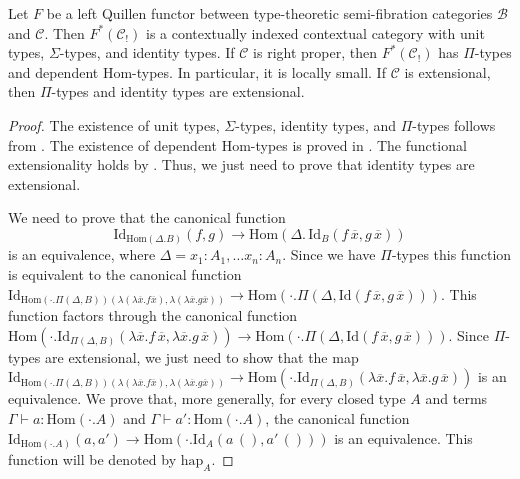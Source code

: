 \documentclass[reqno]{amsart}
\theoremstyle{definition}
\theoremstyle{remark}
\newcommand{\fs}[1]{\mathrm{#1}}
\newcommand{\scat}[1]{\mathcal{#1}}
\newcommand{\Hom}{\fs{Hom}}
\newcommand{\Id}{\fs{Id}}
\numberwithin{figure}{section}
\begin{document}
\begin{prop}
Let $F$ be a left Quillen functor between type-theoretic semi-fibration categories $\scat{B}$ and $\scat{C}$.
Then $F^*(\scat{C}_!)$ is a contextually indexed contextual category with unit types, $\Sigma$-types, and identity types.
If $\scat{C}$ is right proper, then $F^*(\scat{C}_!)$ has $\Pi$-types and dependent $\Hom$-types.
In particular, it is locally small.
If $\scat{C}$ is extensional, then $\Pi$-types and identity types are extensional.
\end{prop}
\begin{proof}
The existence of unit types, $\Sigma$-types, identity types, and $\Pi$-types follows from \cite{local-universes}.
The existence of dependent $\Hom$-types is proved in .
The functional extensionality holds by \cite[Lemma~5.9]{shul-inv}.
Thus, we just need to prove that identity types are extensional.

We need to prove that the canonical function
\[ \Id_{\Hom(\Delta.B)}(f,g) \to \Hom(\Delta.\,\Id_B(f\,\overline{x},g\,\overline{x})) \] is an equivalence, where $\Delta = x_1 : A_1, \ldots x_n : A_n$.
Since we have $\Pi$-types this function is equivalent to the canonical function $\Id_{\Hom(\cdot . \Pi(\Delta,B))(\lambda(\lambda \overline{x}.f\overline{x}),\lambda(\lambda \overline {x}.g\overline{x}))} \to \Hom(\cdot . \Pi(\Delta, \Id(f\,\overline{x},g\,\overline{x})))$.
This function factors through the canonical function $\Hom(\cdot . \Id_{\Pi(\Delta,B)}(\lambda \overline{x}. f\,\overline{x}, \lambda \overline{x}. g\,\overline{x})) \to \Hom(\cdot . \Pi(\Delta, \Id(f\,\overline{x},g\,\overline{x})))$.
Since $\Pi$-types are extensional, we just need to show that the map $\Id_{\Hom(\cdot . \Pi(\Delta,B))(\lambda(\lambda \overline{x}.f\overline{x}),\lambda(\lambda \overline {x}.g\overline{x}))} \to \Hom(\cdot . \Id_{\Pi(\Delta,B)}(\lambda \overline{x}. f\,\overline{x}, \lambda \overline{x}. g\,\overline{x}))$ is an equivalence.
We prove that, more generally, for every closed type $A$ and terms $\Gamma \vdash a : \Hom(\cdot.A)$ and $\Gamma \vdash a' : \Hom(\cdot.A)$, the canonical function $\Id_{\Hom(\cdot . A)}(a,a') \to \Hom(\cdot . \Id_A(a\,(),a'\,()))$ is an equivalence.
This function will be denoted by $\fs{hap}_A$.


\end{proof}
\end{document}
